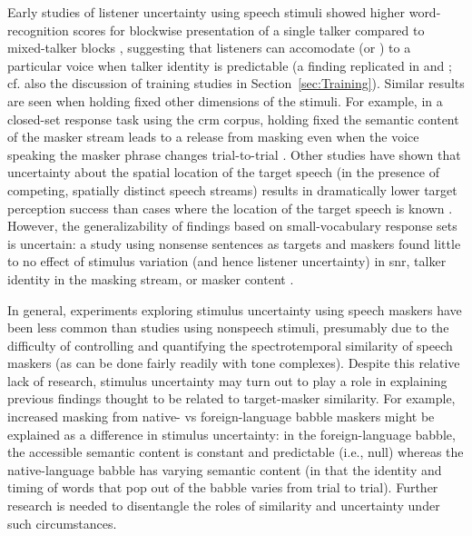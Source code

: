 Early studies of listener uncertainty using speech stimuli showed higher word-recognition scores for blockwise presentation of a single talker compared to mixed-talker blocks \citep{SommersEtAl1994}, suggesting that listeners can accomodate (or ) to a particular voice when talker identity is predictable (a finding replicated in \citealt{BrungartSimpson2004} and \citealt{EricsonEtAl2004}; cf. also the discussion of training studies in Section~\ref{sec:Training}).  
Similar results are seen when holding fixed other dimensions of the stimuli.  For example, in a closed-set response task using the \ac{crm} corpus, holding fixed the semantic content of the masker stream leads to a release from masking even when the voice speaking the masker phrase changes trial-to-trial \citep{BrungartSimpson2004}.  Other studies have shown that uncertainty about the spatial location of the target speech (in the presence of competing, spatially distinct speech streams) results in dramatically lower target perception success than cases where the location of the target speech is known \citep{EricsonEtAl2004, KiddEtAl2005a}.  However, the generalizability of findings based on small-vocabulary response sets is uncertain: a study using nonsense sentences as targets and maskers found little to no effect of stimulus variation (and hence listener uncertainty) in \ac{snr}, talker identity in the masking stream, or masker content \citep{FreymanEtAl2007}.

In general, experiments exploring stimulus uncertainty using speech maskers have been less common than studies using nonspeech stimuli, presumably due to the difficulty of controlling and quantifying the spectrotemporal similarity of speech maskers (as can be done fairly readily with tone complexes).  Despite this relative lack of research, stimulus uncertainty may turn out to play a role in explaining previous findings thought to be related to target-masker similarity.  For example, increased masking from native- vs foreign-language babble maskers \citep[e.g.,][]{RhebergenEtAl2005, GarciaLecumberriCooke2006, VanEngenBradlow2007, BrouwerEtAl2012} might be explained as a difference in stimulus uncertainty: in the foreign-language babble, the accessible semantic content is constant and predictable (i.e., null) whereas the native-language babble has varying semantic content (in that the identity and timing of words that pop out of the babble varies from trial to trial).  Further research is needed to disentangle the roles of similarity and uncertainty under such circumstances.  %


